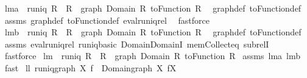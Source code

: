 \begin{isabellebody}
\isanewline
{}\isamarkupfalse%
\ lm{}{}{}a{\isacharcolon}\ \ {\isachardoublequoteopen}runiq\ R{\isachardoublequoteclose}\ \ {\isachardoublequoteopen}R\ {\isasymsupseteq}\ graph\ {\isacharparenleft}Domain\ R{\isacharparenright}\ {\isacharparenleft}toFunction\ R{\isacharparenright}{\isachardoublequoteclose}\ \isanewline
%
\isadelimproof
%
\endisadelimproof
%
\isatagproof
{}\isamarkupfalse%
\ graph{\isacharunderscore}def\ toFunction{\isacharunderscore}def\isanewline
{}\isamarkupfalse%
\ assms\ graph{\isacharunderscore}def\ toFunction{\isacharunderscore}def\ eval{\isacharunderscore}runiq{\isacharunderscore}rel\ \isamarkupfalse%
\ fastforce%
\endisatagproof
{\isafoldproof}%
%
\isadelimproof
\isanewline
%
\endisadelimproof
\isanewline
{}\isamarkupfalse%
\ lm{}{}{}b{\isacharcolon}\ \ {\isachardoublequoteopen}runiq\ R{\isachardoublequoteclose}\ \ {\isachardoublequoteopen}R\ {\isasymsubseteq}\ graph\ {\isacharparenleft}Domain\ R{\isacharparenright}\ {\isacharparenleft}toFunction\ R{\isacharparenright}{\isachardoublequoteclose}\ \isanewline
%
\isadelimproof
%
\endisadelimproof
%
\isatagproof
{}\isamarkupfalse%
\ graph{\isacharunderscore}def\ toFunction{\isacharunderscore}def\isanewline
{}\isamarkupfalse%
\ assms\ eval{\isacharunderscore}runiq{\isacharunderscore}rel\ runiq{\isacharunderscore}basic\ Domain{\isachardot}DomainI\ mem{\isacharunderscore}Collect{\isacharunderscore}eq\ subrelI\ \isamarkupfalse%
\ fastforce%
\endisatagproof
{\isafoldproof}%
%
\isadelimproof
\isanewline
%
\endisadelimproof
\isanewline
{}\isamarkupfalse%
\ lm{}{}{}{\isacharcolon}\ \ {\isachardoublequoteopen}runiq\ R{\isachardoublequoteclose}\ \ {\isachardoublequoteopen}R\ {\isacharequal}\ graph\ {\isacharparenleft}Domain\ R{\isacharparenright}\ {\isacharparenleft}toFunction\ R{\isacharparenright}{\isachardoublequoteclose}\isanewline
%
\isadelimproof
%
\endisadelimproof
%
\isatagproof
{}\isamarkupfalse%
\ assms\ lm{}{}{}a\ lm{}{}{}b\ \isamarkupfalse%
\ fast%
\endisatagproof
{\isafoldproof}%
%
\isadelimproof
\isanewline
%
\endisadelimproof
\isanewline
{}\isamarkupfalse%
\ ll{}{}{\isacharcolon}\ {\isachardoublequoteopen}runiq{\isacharparenleft}graph\ X\ f{\isacharparenright}\ {\isacharampersand}\ Domain{\isacharparenleft}graph\ X\ f{\isacharparenright}{\isacharequal}X{\isachardoublequoteclose}%

\end{isabellebody}
